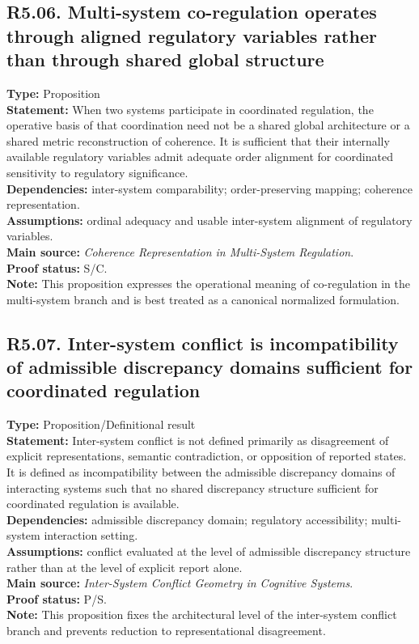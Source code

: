 \documentclass[12pt]{article}
\begin{document}
	\subsection*{R5.06. Multi-system co-regulation operates through aligned regulatory variables rather than through shared global structure}
	\textbf{Type:} Proposition \\
	\textbf{Statement:} When two systems participate in coordinated regulation, the operative basis
	of that coordination need not be a shared global architecture or a shared metric reconstruction
	of coherence. It is sufficient that their internally available regulatory variables admit
	adequate order alignment for coordinated sensitivity to regulatory significance. \\
	\textbf{Dependencies:} inter-system comparability; order-preserving mapping; coherence
	representation. \\
	\textbf{Assumptions:} ordinal adequacy and usable inter-system alignment of regulatory
	variables. \\
	\textbf{Main source:} \emph{Coherence Representation in Multi-System Regulation}. \\
	\textbf{Proof status:} S/C. \\
	\textbf{Note:} This proposition expresses the operational meaning of co-regulation in the
	multi-system branch and is best treated as a canonical normalized formulation.
	
	\subsection*{R5.07. Inter-system conflict is incompatibility of admissible discrepancy domains sufficient for coordinated regulation}
	\textbf{Type:} Proposition/Definitional result \\
	\textbf{Statement:} Inter-system conflict is not defined primarily as disagreement of explicit
	representations, semantic contradiction, or opposition of reported states. It is defined as
	incompatibility between the admissible discrepancy domains of interacting systems such that no
	shared discrepancy structure sufficient for coordinated regulation is available. \\
	\textbf{Dependencies:} admissible discrepancy domain; regulatory accessibility; multi-system
	interaction setting. \\
	\textbf{Assumptions:} conflict evaluated at the level of admissible discrepancy structure rather
	than at the level of explicit report alone. \\
	\textbf{Main source:} \emph{Inter-System Conflict Geometry in Cognitive Systems}. \\
	\textbf{Proof status:} P/S. \\
	\textbf{Note:} This proposition fixes the architectural level of the inter-system conflict
	branch and prevents reduction to representational disagreement.
	
\end{document}
